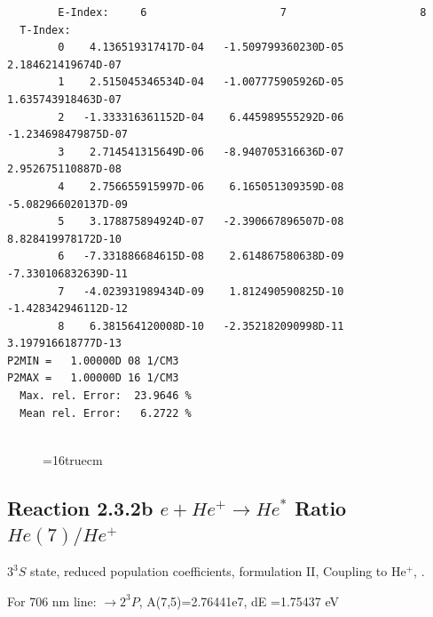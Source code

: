 \documentclass[12pt,dvipdfmx]{article}
\begin{document}
\begin{small}
\begin{verbatim}
        E-Index:     6                     7                     8
  T-Index:
        0    4.136519317417D-04   -1.509799360230D-05    2.184621419674D-07
        1    2.515045346534D-04   -1.007775905926D-05    1.635743918463D-07
        2   -1.333316361152D-04    6.445989555292D-06   -1.234698479875D-07
        3    2.714541315649D-06   -8.940705316636D-07    2.952675110887D-08
        4    2.756655915997D-06    6.165051309359D-08   -5.082966020137D-09
        5    3.178875894924D-07   -2.390667896507D-08    8.828419978172D-10
        6   -7.331886684615D-08    2.614867580638D-09   -7.330106832639D-11
        7   -4.023931989434D-09    1.812490590825D-10   -1.428342946112D-12
        8    6.381564120008D-10   -2.352182090998D-11    3.197916618777D-13
P2MIN =   1.00000D 08 1/CM3
P2MAX =   1.00000D 16 1/CM3
  Max. rel. Error:  23.9646 %
  Mean rel. Error:   6.2722 %


\end{verbatim}\end{small}
\begin{figure} \label{2.3.2a}
\epsfxsize=16truecm
\end{figure}
\newpage


\subsection{
  Reaction 2.3.2b $e + He^+ \rightarrow He^*  $ Ratio $He(7)/He^+$
}

  $3^3S$ state,
  reduced population coefficients, formulation II,
  Coupling to He$^+$, \cite{kn:Fujimoto}.

  For 706 nm line: $\rightarrow 2^3P$, A(7,5)=2.76441e7, dE =1.75437 eV
\end{document}
